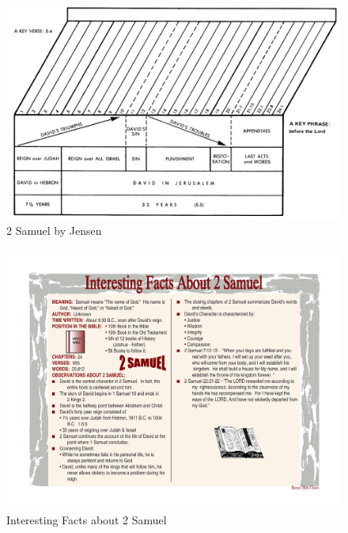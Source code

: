 \newpage
\begin{figure}
\begin{center}
\includegraphics[scale=1.5, angle=90]{10OT-2Samuel/References/Jensen-2Samuel.png}
\caption[2 Samuel by Jensen]{2 Samuel by Jensen}
\label{fig:2 Samuel by Jensen}
\end{center}
\end{figure}


\newpage
\begin{figure}
\begin{center}
\includegraphics[scale=0.5, angle=0]{10OT-2Samuel/References/interestingfactsaboutsecondsamuel.pdf}
\caption[Interesting Facts about 2 Samuel]{Interesting Facts about 2 Samuel}
\label{fig:Interesting Facts about 1 Samuel}
\end{center}
\end{figure}

